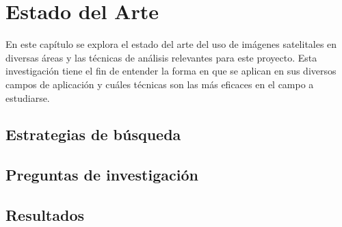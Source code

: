 \section{Estado del Arte}

En este capítulo se explora el estado del arte del uso de imágenes satelitales en diversas áreas y las técnicas
de análisis relevantes para este proyecto. Esta investigación tiene el fin de entender la forma en que se aplican en sus
diversos campos de aplicación y cuáles técnicas son las más eficaces en el campo a estudiarse.

\subsection{Estrategias de búsqueda}


\subsection{Preguntas de investigación}
\subsection{Resultados}
